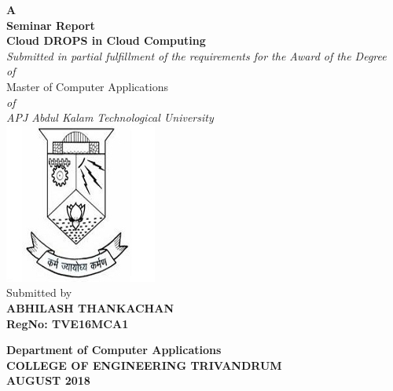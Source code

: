 \begin{titlepage}
\begin{center}
\textbf{ A  }\\
\vspace{0.35cm}
\textbf{ Seminar Report}\\
\vspace{0.55cm}
\textbf{\Large{Cloud DROPS in Cloud Computing}}\\ \vspace{0.2cm}
\normalsize
\vspace{0.5cm}
\emph{Submitted in partial fulfillment of the requirements for the Award of the Degree}\\
\vspace{0.35cm}
\emph{of}\\
\vspace{0.35cm}
Master of Computer Applications\\
\vspace{0.35cm}
\emph{of}\\
\vspace{0.35cm}
\emph{ {APJ Abdul Kalam Technological University} }\\
\normalsize
\vspace{0.5cm}
\includegraphics[height=0.30\textwidth]{./logo}\\
\vspace{0.3cm}
Submitted by\\
\vspace{0.3cm}
\textbf{ABHILASH THANKACHAN}\\
\vspace{0.5cm}
\textbf{RegNo: TVE16MCA1 }\\
\vspace{1.8cm}

\normalsize
\textbf{Department of Computer Applications}\\[0.3cm]
\textbf{COLLEGE OF ENGINEERING TRIVANDRUM}\\[0.4cm]
\textbf{AUGUST 2018}\\
\end{center}
\end{titlepage}

